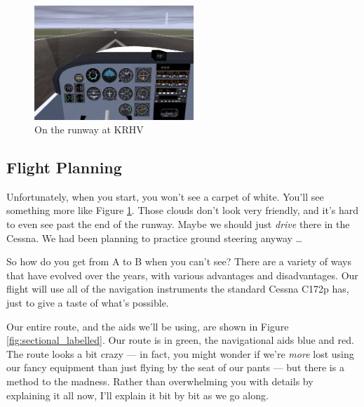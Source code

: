 

\begin{figure}
  \begin{center}
    \includegraphics[width=6cm]{img/KRHV}
    \caption{On the runway at KRHV}
    \label{fig:KRHV}
  \end{center}
\end{figure}

\subsection{Flight Planning}

Unfortunately, when you start, you won't see a carpet of white.
You'll see something more like Figure \ref{fig:KRHV}.  Those clouds
don't look very friendly, and it's hard to even see past the end of
the runway.  Maybe we should just \emph{drive} there in the Cessna.
We had been planning to practice ground steering anyway \ldots{}

So how do you get from A to B when you can't see?  There are a variety
of ways that have evolved over the years, with various advantages and
disadvantages.  Our flight will use all of the navigation instruments
the standard Cessna C172p has, just to give a taste of what's
possible.

Our entire route, and the aids we'll be using, are shown in
Figure \ref{fig:sectional_labelled}.  Our route is in green, the
navigational aids blue and red.  The route looks a bit crazy --- in
fact, you might wonder if we're \emph{more} lost using our fancy
equipment than just flying by the seat of our pants --- but there is a
method to the madness.  Rather than overwhelming you with details by
explaining it all now, I'll explain it bit by bit as we go along.

